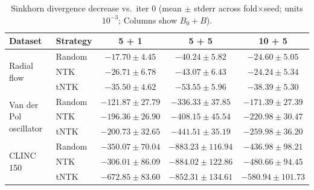 \begin{table}[ht]
\centering
\small
\caption{Sinkhorn divergence decrease vs.\ iter 0 (mean $\pm$ stderr across fold$\times$seed; units $10^{-3}$; Columns show $B_0 + B$).}
\label{tab:cflow_ring2_rf_ntk_tntk_sinkhorn_dec_v3}
\begin{tabular}{llccc}
\toprule
Dataset & Strategy & 5 + 1 & 5 + 5 & 10 + 5 \\
\midrule
\multirow{3}{*}{Radial flow} & Random & $-17.70 \pm 4.45$ & $-40.24 \pm 5.82$ & $-24.60 \pm 5.05$ \\
 & NTK & $-26.71 \pm 6.78$ & $-43.07 \pm 6.43$ & $-24.24 \pm 5.34$ \\
 & tNTK & $\mathbf{-35.50 \pm 4.62}$ & $\mathbf{-53.55 \pm 5.96}$ & $\mathbf{-38.39 \pm 5.30}$ \\
\midrule
\multirow{3}{*}{Van der Pol oscillator} & Random & $-121.87 \pm 27.79$ & $-336.33 \pm 37.85$ & $-171.39 \pm 27.39$ \\
 & NTK & $-196.36 \pm 26.90$ & $-408.15 \pm 45.54$ & $-220.98 \pm 30.47$ \\
 & tNTK & $\mathbf{-200.73 \pm 32.65}$ & $\mathbf{-441.51 \pm 35.19}$ & $\mathbf{-259.98 \pm 36.20}$ \\
\midrule
\multirow{3}{*}{CLINC 150} & Random & $-350.07 \pm 70.04$ & $-883.23 \pm 116.94$ & $-436.98 \pm 98.21$ \\
 & NTK & $-306.01 \pm 86.09$ & $\mathbf{-884.02 \pm 122.86}$ & $-480.66 \pm 94.45$ \\
 & tNTK & $\mathbf{-672.85 \pm 83.60}$ & $-852.31 \pm 134.61$ & $\mathbf{-580.94 \pm 101.73}$ \\
\bottomrule
\end{tabular}
\end{table}
